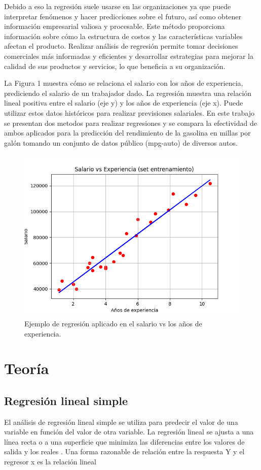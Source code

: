 \documentclass[conference]{IEEEtran}
\begin{document}
Debido a eso la regresión suele usarse en las organizaciones ya que puede interpretar fenómenos y hacer predicciones sobre el futuro, así como obtener información empresarial valiosa y procesable. Este método proporciona información sobre cómo la estructura de costos y las características variables afectan el producto. Realizar análisis de regresión permite tomar decisiones comerciales más informadas y eficientes y desarrollar estrategias para mejorar la calidad de sus productos y servicios, lo que beneficia a su organización.

La Figura 1 muestra cómo se relaciona el salario con los años de experiencia, prediciendo el salario de un trabajador dado. La regresión muestra una relación lineal positiva entre el salario (eje y) y los años de experiencia (eje x). Puede utilizar estos datos históricos para realizar previsiones salariales. En este trabajo se presentan dos metodos para realizar regresiones y se compara la efectividad de ambos aplicados para la predicción del rendimiento de la gasolina en millas por galón tomando un conjunto de datos público (mpg-auto) de diversos autos.

\begin{figure}[h]
    \centering
    \includegraphics[scale=0.6]{1.png}
    \caption{Ejemplo de regresión aplicado en el salario vs los años de experiencia.}
    \label{fig:mesh1}
\end{figure}

\section{Teoría}
\subsection{Regresión lineal simple}
El análisis de regresión lineal simple se utiliza para predecir el valor de una variable en función del valor de otra variable. La regresión lineal se ajusta a una línea recta o a una superficie que minimiza las diferencias entre los valores de salida y los reales \cite{b1}. Una forma razonable de relación entre la respuesta Y y el regresor x es la relación lineal
\end{document}
